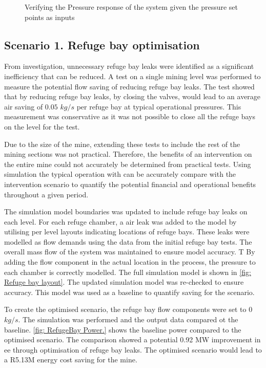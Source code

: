 	\begin{figure}[h]
		\centering
		
		\caption{Verifying the Pressure response of the system given the pressure set points as inputs}
		\label{fig: Verification Pressure kusasalethu Setpoint}
	\end{figure}

	\subsection{Scenario 1. Refuge bay optimisation}
	From investigation, unnecessary refuge bay leaks were identified as a significant inefficiency that can be reduced. A test on a single mining level was performed to  measure the potential flow saving of reducing refuge bay leaks. The test showed that by reducing refuge bay leaks, by closing the valves, would lead to an average air saving of $0.05$ $kg/s$ per refuge bay at typical operational pressures. This measurement was conservative as it was not possible to close all the refuge bays on the level for the test. 
	\par 
	Due to the size of the mine, extending these tests to include the rest of the mining sections was not practical. Therefore, the benefits of an intervention on the entire mine could not accurately be determined from practical tests. Using simulation the typical operation with can be accurately compare with the intervention scenario to quantify the potential financial and operational benefits throughout a given period.
	\par
	The simulation model boundaries was updated to include refuge bay leaks on each level. For each refuge chamber, a air leak was added to the model by utilising per level layouts indicating locations of refuge bays. These leaks were modelled as flow demands using the data from the initial refuge bay tests. The overall mass flow of the system was maintained to ensure model accuracy. T  By adding the flow component in the actual location in the process, the pressure to each chamber is correctly modelled. The full simulation model is shown in \cref{fig: Refuge bay layout}. The updated simulation model was re-checked to ensure accuracy. This model was used as a baseline to quantify saving for the scenario.
	\par 
	To create the optimised scenario, the refuge bay flow components were set to 0 $kg/s$. The simulation was performed and the output data compared ot the baseline. \cref{fig: RefugeBay Power.} shows the baseline power compared to the optimised scenario. The comparison showed a potential 0.92 MW  improvement in \gls{ee} through optimisation of refuge bay leaks. The optimised scenario would lead to a R5.13M energy cost saving for the mine.

